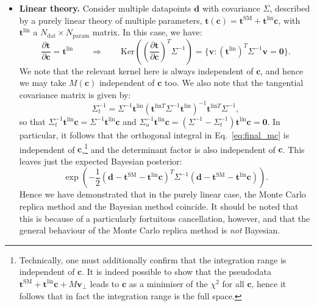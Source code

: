 \documentclass[withindex,glossary]{cam-thesis}
\renewcommand{\vec}[1]{\textbf{#1}} %
\begin{document}
\begin{itemize}
\item \textbf{Linear theory.} Consider multiple datapoints $\vec{d}$ with covariance $\Sigma$, described by a purely linear theory of multiple parameters, $\vec{t}(\vec{c}) = \vec{t}^{\text{SM}} + \vec{t}^{\text{lin}} \vec{c}$, with $\vec{t}^{\text{lin}}$ a $N_{\text{dat}} \times N_{\text{param}}$ matrix. In this case, we have:
\begin{equation}
\frac{\partial \vec{t}}{\partial \vec{c}} = \vec{t}^{\text{lin}} \qquad \Rightarrow \qquad \textrm{Ker}\left( \left( \frac{\partial \vec{t}}{\partial \vec{c}} \right)^T \Sigma^{-1} \right) = \{ \vec{v} : (\vec{t}^{\text{lin}})^T \Sigma^{-1} \vec{v} = \vec{0}\}.
\end{equation}
We note that the relevant kernel here is always independent of $\vec{c}$, and hence we may take $M(\vec{c})$ independent of $\vec{c}$ too. We also note that the tangential covariance matrix is given by:
\begin{equation}
\Sigma_t^{-1} = \Sigma^{-1} \vec{t}^{\text{lin}} (\vec{t}^{\text{lin}T} \Sigma^{-1} \vec{t}^{\text{lin}})^{-1} \vec{t}^{\text{lin}T} \Sigma^{-1},
\end{equation}
so that $\Sigma_t^{-1} \vec{t}^{\text{lin}}\vec{c} = \Sigma^{-1} \vec{t}^{\text{lin}} \vec{c}$ and $\Sigma_o^{-1}\vec{t}^{\text{lin}}\vec{c} = (\Sigma^{-1} - \Sigma_t^{-1})\vec{t}^{\text{lin}}\vec{c} = \vec{0}$. In particular, it follows that the orthogonal integral in Eq.~\eqref{eq:final_mc} is independent of $\vec{c}$,\footnote{Technically, one must additionally confirm that the integration range is independent of $\vec{c}$. It is indeed possible to show that the pseudodata $\vec{t}^{\text{SM}} + \vec{t}^{\text{lin}}\vec{c} + M\vec{v}_{\perp}$ leads to $\vec{c}$ as a minimiser of the $\chi^2$ for all $\vec{c}$, hence it follows that in fact the integration range is the full space.} and the determinant factor is also independent of $\vec{c}$. This leaves just the expected Bayesian posterior:
\begin{equation}
\exp\left( -\frac{1}{2} (\vec{d} - \vec{t}^{\text{SM}} - \vec{t}^{\text{lin}} \vec{c})^T \Sigma^{-1} (\vec{d} - \vec{t}^{\text{SM}} - \vec{t}^{\text{lin}} \vec{c}) \right).
\end{equation}
Hence we have demonstrated that in the purely linear case, the Monte Carlo replica method and the Bayesian method coincide. It should be noted that this is because of a particularly fortuitous cancellation, however, and that the general behaviour of the Monte Carlo replica method is \textit{not} Bayesian.


\end{itemize}
\end{document}
